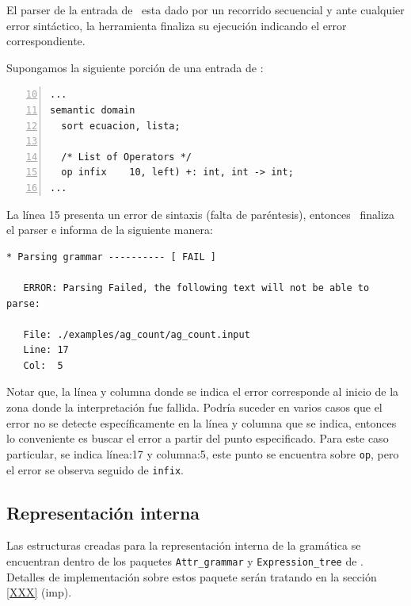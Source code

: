 El parser de la entrada de \maggen\ esta dado por un recorrido secuencial y ante cualquier error sintáctico, la herramienta finaliza su ejecución indicando el error correspondiente. 

Supongamos la siguiente porción de una entrada de \maggen:

\vspace{0.3cm}
\begin{lstlisting}[basicstyle=\footnotesize, numbers=left, firstnumber=10, numbers=left, language=specmag, linewidth=9cm, columns=fullflexible]
...
semantic domain
  sort ecuacion, lista;

  /* List of Operators */
  op infix    10, left) +: int, int -> int;
...
\end{lstlisting}
\vspace{0.3cm}

La línea 15 presenta un error de sintaxis (falta de paréntesis), entonces \maggen\ finaliza el parser e informa de la siguiente manera:

\vspace{0.3cm}
\begin{lstlisting}[backgroundcolor=\color{white}, basicstyle=\footnotesize]
   * Parsing grammar ---------- [ FAIL ]

   ERROR: Parsing Failed, the following text will not be able to parse:

   File: ./examples/ag_count/ag_count.input
   Line: 17
   Col:  5
\end{lstlisting}
\vspace{0.3cm}

Notar que, la línea y columna donde se indica el error corresponde al inicio de la zona donde la interpretación fue fallida. Podría suceder en varios casos que el error no se detecte específicamente en la línea y columna que se indica, entonces lo conveniente es buscar el error a partir del punto especificado. Para este caso particular, se indica línea:17 y columna:5, este punto se encuentra sobre \texttt{op}, pero el error se observa seguido de \texttt{infix}.

\subsection*{Representación interna}

Las estructuras creadas para la representación interna de la gramática se encuentran dentro de los paquetes \texttt{Attr\_grammar} y \texttt{Expression\_tree} de \maggen. Detalles de implementación sobre estos paquete serán tratando en la sección \ref{XXX} (imp). 

